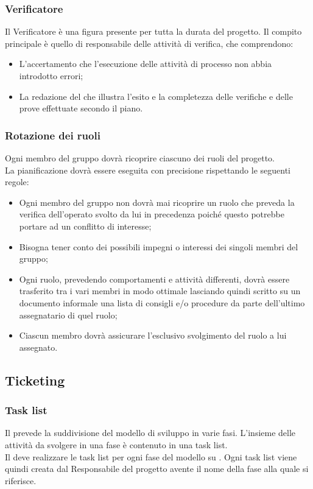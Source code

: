 \documentclass[NormeDiProgetto.tex]{subfiles}
\begin{document}
	\subsubsection{Verificatore}
	Il Verificatore è una figura presente per tutta la durata del progetto. Il compito principale è quello di responsabile delle attività di verifica, che comprendono:
	\begin{itemize}
	\item L'accertamento che l'esecuzione delle attività di processo non abbia introdotto errori;
	\item La redazione del \pdq{} che illustra l'esito e la completezza delle verifiche e delle prove effettuate secondo il piano.
	\end{itemize}
	
	\subsubsection{Rotazione dei ruoli}
	Ogni membro del gruppo dovrà ricoprire ciascuno dei ruoli del progetto.\\
	La pianificazione dovrà essere eseguita con precisione rispettando le seguenti regole:
	\begin{itemize}
		\item Ogni membro del gruppo non dovrà mai ricoprire un ruolo che preveda la verifica dell'operato svolto da lui in precedenza poiché questo potrebbe	portare ad un conflitto di interesse;
		\item Bisogna tener conto dei possibili impegni o interessi dei singoli membri del gruppo;
		\item Ogni ruolo, prevedendo comportamenti e attività differenti, dovrà essere trasferito tra i vari membri in modo ottimale lasciando quindi scritto su un documento informale una lista di consigli e/o procedure da parte dell'ultimo assegnatario di quel ruolo;
		\item Ciascun membro dovrà assicurare l’esclusivo svolgimento del ruolo a lui assegnato.
	\end{itemize}
	
	
	\subsection{Ticketing}
	\subsubsection{Task list}
	Il \pdp{} prevede la suddivisione del modello di sviluppo in varie fasi.
	L'insieme delle attività da svolgere in una fase è contenuto in una task list.\\
	Il \respdiprog{} deve realizzare le task list per ogni fase del modello su .
	Ogni task list viene quindi creata dal Responsabile del progetto avente il nome della fase alla quale si riferisce.
	
\end{document}
